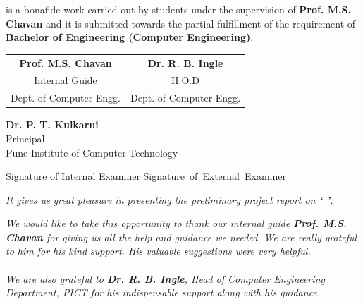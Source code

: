 \documentclass[oneside,a4paper,12pt, times]{book}
\begin{document}
is a bonafide work carried out by students under the supervision of \textbf{Prof. M.S. Chavan} and it
is submitted towards the partial fulfillment of the requirement of \textbf{Bachelor of Engineering (Computer Engineering)}.\\
\vskip 1cm
\bgroup
\def\arraystretch{0.7}
\begin{tabular}{c c }
\textbf{Prof. M.S. Chavan} &  \hspace{50 mm} \textbf{Dr. R. B. Ingle} \\								
Internal Guide   &  \hspace{50 mm} H.O.D \\
Dept. of Computer Engg.  &	\hspace{50 mm}Dept. of Computer Engg.  \\
\end{tabular}
\begin{center}
{
\vskip 1cm
\textbf{Dr. P. T. Kulkarni}\\
Principal\\
Pune Institute of Computer Technology  
}
\end{center}
\vskip 1cm
Signature of Internal Examiner \hspace{40 mm}\mbox{Signature of External Examiner}

\newpage

\setcounter{page}{0}

\frontmatter
{}


{   \setlength{\parindent}{11mm} }
{ \setlength{\parindent}{0mm} }
\textit{It gives us great pleasure in presenting the preliminary project report 
on {\bfseries \fontsize{12}{12} \selectfont `{\bfseries \fontsize{14}{12} \selectfont {Comprehensive Developer Assistant (CODA)}
}'}.}


 \textit{We would like to take this opportunity to thank our internal guide
 \textbf{Prof. M.S. Chavan} for giving us all the help and guidance we needed. We are really grateful to him for his kind support. His valuable suggestions were very helpful.} 
\\
\\
 \textit{We are also grateful to \textbf{Dr. R. B. Ingle}, Head of Computer
 Engineering Department, PICT for his indispensable
 support along with his guidance.}
\end{document}
